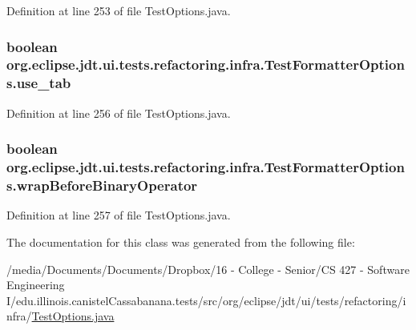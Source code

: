 Definition at line 253 of file TestOptions.java.

\hypertarget{classorg_1_1eclipse_1_1jdt_1_1ui_1_1tests_1_1refactoring_1_1infra_1_1TestFormatterOptions_a662e53b70676b01dbf7c108ce7142729}{
\subsubsection[{use\_\-tab}]{\setlength{\rightskip}{0pt plus 5cm}boolean {\bf org.eclipse.jdt.ui.tests.refactoring.infra.TestFormatterOptions.use\_\-tab}}}
\label{classorg_1_1eclipse_1_1jdt_1_1ui_1_1tests_1_1refactoring_1_1infra_1_1TestFormatterOptions_a662e53b70676b01dbf7c108ce7142729}


Definition at line 256 of file TestOptions.java.

\hypertarget{classorg_1_1eclipse_1_1jdt_1_1ui_1_1tests_1_1refactoring_1_1infra_1_1TestFormatterOptions_a28a8afd31e2f9fdec091772d2edb0e46}{
\subsubsection[{wrapBeforeBinaryOperator}]{\setlength{\rightskip}{0pt plus 5cm}boolean {\bf org.eclipse.jdt.ui.tests.refactoring.infra.TestFormatterOptions.wrapBeforeBinaryOperator}}}
\label{classorg_1_1eclipse_1_1jdt_1_1ui_1_1tests_1_1refactoring_1_1infra_1_1TestFormatterOptions_a28a8afd31e2f9fdec091772d2edb0e46}


Definition at line 257 of file TestOptions.java.



The documentation for this class was generated from the following file:\begin{DoxyCompactItemize}
\item 
/media/Documents/Documents/Dropbox/16 -\/ College -\/ Senior/CS 427 -\/ Software Engineering I/edu.illinois.canistelCassabanana.tests/src/org/eclipse/jdt/ui/tests/refactoring/infra/\hyperlink{TestOptions_8java}{TestOptions.java}\end{DoxyCompactItemize}

